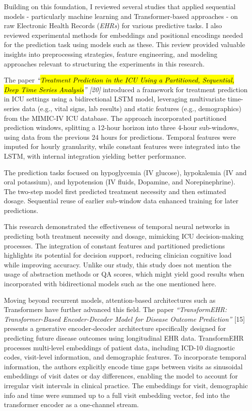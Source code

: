 \documentclass[
]{article}
\begin{document}
Building on this foundation, I reviewed several studies that applied
sequential models - particularly machine learning and Transformer-based
approaches - on raw Electronic Health Records (\emph{EHRs}) for various
predictive tasks. I also reviewed experimental methods for embeddings
and positional encodings needed for the prediction task using models
such as these. This review provided valuable insights into preprocessing
strategies, feature engineering, and modeling approaches relevant to
structuring the experiments in this research.

The paper \emph{``\hl{Treatment Prediction in the ICU Using a
Partitioned, Sequential, Deep Time Series Analysis}'' {[}20{]}}
introduced a framework for treatment prediction in ICU settings using a
bidirectional LSTM model, leveraging multivariate time-series data
(e.g., vital signs, lab results) and static features (e.g.,
demographics) from the MIMIC-IV ICU database. The approach incorporated
partitioned prediction windows, splitting a 12-hour horizon into three
4-hour sub-windows, using data from the previous 24 hours for
predictions. Temporal features were imputed for hourly granularity,
while constant features were integrated into the LSTM, with internal
integration yielding better performance.

The prediction tasks focused on hypoglycemia (IV glucose), hypokalemia
(IV and oral potassium), and hypotension (IV fluids, Dopamine, and
Norepinephrine). The two-step model first predicted treatment necessity
and then estimated dosage. Sequential reuse of earlier sub-window data
enhanced training for later predictions.

This research demonstrated the effectiveness of temporal neural networks
in predicting both treatment necessity and dosage, mimicking ICU
decision-making processes. The integration of constant features and
partitioned predictions highlights its potential for decision support,
reducing clinician cognitive load while improving accuracy. Unlike our
study, this study does not mention the usage of abstraction methods or
QA scores, which might yield good results when incorporated with
bidirectional models such as the one mentioned here.

Moving beyond recurrent models, attention-based architectures such as
Transformers have further advanced this field. The paper
\emph{``TransformEHR: Transformer-Based Encoder-Decoder Model for
Disease Outcome Prediction''} {[}15{]} presents a generative
encoder-decoder architecture specifically designed for predicting future
disease outcomes using longitudinal EHR data. TransformEHR processes
multi-level embeddings of patient data, including ICD-10 diagnostic
codes, visit-level information, and demographic features. To incorporate
temporal information, the authors explicitly encode time gaps between
visits as sinusoidal embeddings of visit dates or day differences,
enabling the model to account for irregular visit intervals in clinical
practice. The embeddings for visit, demographic info and time were
summed up to a full visit embedding vector, fed into the transformer
encoder as a one-channel stream.
\end{document}
